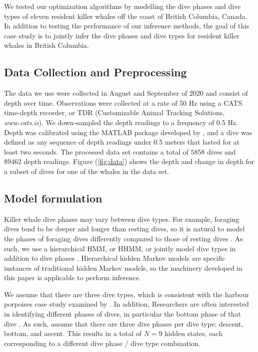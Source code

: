 
We tested our optimization algorithms by modelling the dive phases and dive types of eleven resident killer whales off the coast of British Columbia, Canada. In addition to testing the performance of our inference methods, the goal of this case study is to jointly infer the dive phases and dive types for resident killer whales in British Columbia.

\subsection{Data Collection and Preprocessing}

The data we use were collected in August and September of 2020 and consist of depth over time. Observations were collected at a rate of 50 Hz using a CATS time-depth recorder, or TDR (Customizable Animal Tracking Solutions, {\em{www.cats.is}}). We down-sampled the depth readings to a frequency of 0.5 Hz. Depth was calibrated using the MATLAB package developed by \citet{Cade:2021}, and a dive was defined as any sequence of depth readings under 0.5 meters that lasted for at least two seconds. The processed data set contains a total of $5858$ dives and $89462$ depth readings. Figure (\ref{fig:data}) shows the depth and change in depth for a subset of dives for one of the whales in the data set. 

\subsection{Model formulation}

Killer whale dive phases may vary between dive types. For example, foraging dives tend to be deeper and longer than resting dives, so it is natural to model the phases of foraging dives differently compared to those of resting dives \citep{Tennessen:2019a}. As such, we use a hierarchical HMM, or HHMM, or jointly model dive types in addition to dive phases \citep{Barajas:2017}. Hierarchical hidden Markov models are specific instances of traditional hidden Markov models, so the machinery developed in this paper is applicable to perform inference. 

We assume that there are three dive types, which is consistent with the harbour porpoises case study examined by \citet{Barajas:2017}. In addition, Researchers are often interested in identifying different phases of dives, in particular the bottom phase of that dive \citep{Wright:2017,}. As such, assume that there are three dive phases per dive type: descent, bottom, and ascent. This results in a total of $N = 9$ hidden states, each corresponding to a different dive phase / dive type combination. 

